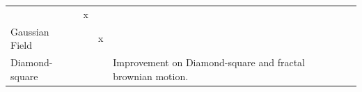 \documentclass[11pt]{article}
\begin{document}
\begin{longtable}[]{@{}llllll@{}}
\begin{minipage}[t]{0.07\columnwidth}
\end{minipage} & \begin{minipage}[t]{0.05\columnwidth}\raggedright
x\strut
\end{minipage} & \begin{minipage}[t]{0.33\columnwidth}\raggedright
\strut
\end{minipage} & \begin{minipage}[t]{0.02\columnwidth}\raggedright
\strut
\end{minipage} & \begin{minipage}[t]{0.02\columnwidth}\raggedright
\strut
\end{minipage}\tabularnewline
\begin{minipage}[t]{0.35\columnwidth}\raggedright
Gaussian Field\strut
\end{minipage} & \begin{minipage}[t]{0.07\columnwidth}\raggedright
\strut
\end{minipage} & \begin{minipage}[t]{0.05\columnwidth}\raggedright
x\strut
\end{minipage} & \begin{minipage}[t]{0.33\columnwidth}\raggedright
\strut
\end{minipage} & \begin{minipage}[t]{0.02\columnwidth}\raggedright
\strut
\end{minipage} & \begin{minipage}[t]{0.02\columnwidth}\raggedright
\strut
\end{minipage}\tabularnewline
\begin{minipage}[t]{0.35\columnwidth}\raggedright
Diamond-square\strut
\end{minipage} & \begin{minipage}[t]{0.07\columnwidth}\raggedright
\strut
\end{minipage} & \begin{minipage}[t]{0.05\columnwidth}\raggedright
\strut
\end{minipage} & \begin{minipage}[t]{0.33\columnwidth}\raggedright
Improvement on Diamond-square and fractal brownian motion.\strut
\end{minipage} & \begin{minipage}[t]{0.02\columnwidth}\raggedright
\strut
\end{minipage} & \begin{minipage}[t]{0.02\columnwidth}\raggedright
\strut
\end{minipage}\tabularnewline

\end{longtable}
\end{document}
